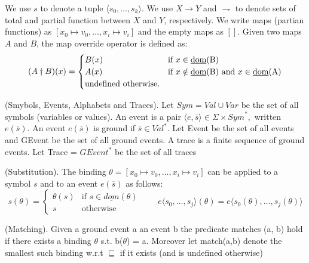 			We use $s$ to denote a tuple $\langle s_0,\dots,s_k \rangle$. We use $X \rightarrow Y$ and $\rightharpoondown$ to denote sets of total and partial function between
			$X$ and $Y$, respectively. We write maps (partian functions) as $[x_0 \mapsto v_0,\dots,x_i \mapsto v_i]$ and the empty maps as $[]$. Given two maps $A$ and $B$,
			the map override operator is defined as:
				\[
				 (A \dagger B)(x) = 
				  \begin{cases} 
				   B(x) & \text{if } x \in \text{\underline{dom}(B)} \\
				   A(x) & \text{if } x \notin \text{\underline{dom}(B)} \text{ and } x \in \text{\underline{dom}(A)} \\
				   \text{undefined otherwise.}
				  \end{cases}
				\]
 			
			\begin{dfn}
				(Smybols, Events, Alphabets and Traces).
				Let $\mathit{Sym} = \mathit{Val} \cup \mathit{Var}$ be the set of all symbols (variables or values).
				An event is a pair $\langle e, \overline{s} \rangle \in \Sigma \times \mathit{Sym}^\ast,$ written $e(\overline{s})$.
				An event $e(\overline{s})$ is ground if $\overline{s} \in \mathit{Val}^\ast$.
				Let Event be the set of all events and GEvent be the set of all ground events.
				A trace is a finite sequence of ground events.
				Let Trace = $GEvent^\ast$ be the set of all traces
			\end{dfn}
			
			\begin{dfn}
				(Substitution).
				The binding $\theta = [x_0 \mapsto v_0, \dots, x_i \mapsto v_i]$ can be applied to a symbol $s$ and to an event
				$e(\overline{s})$ as follows: 
				\[
				 s(\theta) = 
				  \begin{cases} 
				   \theta(s) & \text{if } s \in \underline{dom}(\theta) \\
				   s & \text{otherwise}
				  \end{cases}
				  \qquad e \langle s_0,\ldots,s_j \rangle (\theta) = e \langle s_0(\theta),\ldots,s_j(\theta) \rangle
				\]
			\end{dfn}
			
			\begin{dfn}
				(Matching).
				Given a ground event a an event b the predicate matches (a, b) hold if there exists a binding $\theta$ s.t. b($\theta$) = a.
				Moreover let match(a,b) denote the smallest such binding w.r.t $\sqsubseteq$ if it exists (and is undefined otherwise)
			\end{dfn}
			
